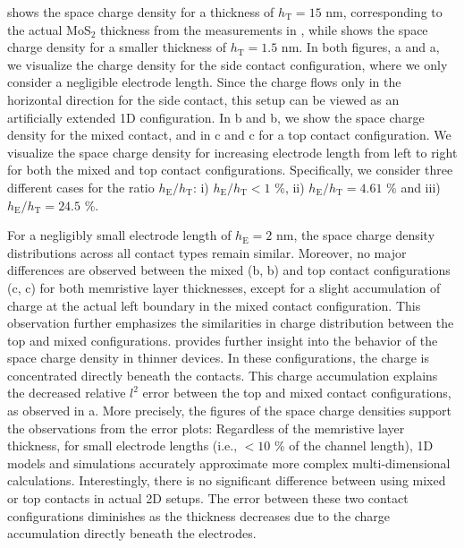 \documentclass[10pt,a4paper, final]{article}
\theoremstyle{definition}								%
\numberwithin{equation}{section}
\numberwithin{figure}{section}
\numberwithin{theorem}{section}
\begin{document}
 shows the space charge density for a thickness of $h_\text{T} = 15$ nm, corresponding to the actual MoS$_2$ thickness from the measurements in \cite{DaLi.2018}, while  shows the space charge density for a smaller thickness of $h_\text{T} = 1.5$ nm.
In both figures, a and a, we visualize the charge density for the side contact configuration, where we only consider a negligible electrode length. Since the charge flows only in the horizontal direction for the side contact, this setup can be viewed as an artificially extended 1D configuration.
In b and b, we show the space charge density for the mixed contact, and in c and c for a top contact configuration.
We visualize the space charge density for increasing electrode length from left to right for both the mixed and top contact configurations.
Specifically, we consider three different cases for the ratio $h_\text{E}/h_\text{T}$: i) $h_\text{E}/h_\text{T} < 1 $ \%, ii) $h_\text{E}/h_\text{T} = 4.61 $ \% and iii) $h_\text{E}/h_\text{T} = 24.5 $ \%.

For a negligibly small electrode length of $h_\text{E} = 2$ nm, the space charge density distributions across all contact types remain similar.
Moreover, no major differences are observed between the mixed (b, b) and top contact configurations (c, c) for both memristive layer thicknesses, except for a slight accumulation of charge at the actual left boundary in the mixed contact configuration.
This observation further emphasizes the similarities in charge distribution between the top and mixed configurations.
 provides further insight into the behavior of the space charge density in thinner devices.
In these configurations, the charge is concentrated directly beneath the contacts.
This charge accumulation explains the decreased relative $l^2$ error between the top and mixed contact configurations, as observed in a.
More precisely, the figures of the space charge densities support the observations from the error plots:
Regardless of the memristive layer thickness, for small electrode lengths (i.e., $ <10$ \% of the channel length), 1D models and simulations accurately approximate more complex multi-dimensional calculations.
Interestingly, there is no significant difference between using mixed or top contacts in actual 2D setups.
The error between these two contact configurations diminishes as the thickness decreases due to the charge accumulation directly beneath the electrodes.
\end{document}
